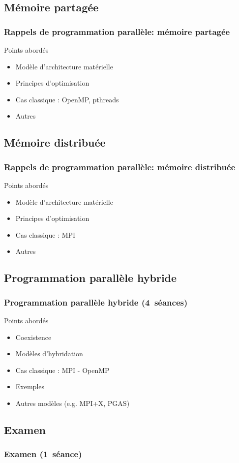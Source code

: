 \documentclass{beamer}
\begin{document}
\begin{frame}
\subsection{Mémoire partagée}
\frametitle{Rappels de programmation parallèle: mémoire partagée}
Points abordés
\begin{itemize}
\item Modèle d'architecture matérielle
\item Principes d'optimisation
\item Cas classique : OpenMP, pthreads
\item Autres
\end{itemize}
\end{frame}

\begin{frame}
\subsection{Mémoire distribuée}
\frametitle{Rappels de programmation parallèle: mémoire distribuée}
Points abordés
\begin{itemize}
\item Modèle d'architecture matérielle
\item Principes d'optimisation
\item Cas classique : MPI
\item Autres
\end{itemize}
\end{frame}

\begin{frame}
\section{Programmation parallèle hybride}
\frametitle{Programmation parallèle hybride \hbox{(4 séances)}}
Points abordés
\begin{itemize}
\item Coexistence 
\item Modèles d'hybridation
\item Cas classique : MPI - OpenMP
\item Exemples
\item Autres modèles (e.g. MPI+X, PGAS)
\end{itemize}
\end{frame}

\begin{frame}
\section{Examen}
\frametitle{Examen \hbox{(1 séance)}}
\end{frame}
\end{document}
